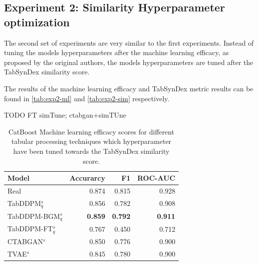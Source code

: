 \subsection{Experiment 2: Similarity Hyperparameter optimization}
\label{ch:Experiment-2}

The second set of experiments are very similar to the first experiments.
Instead of tuning the models hyperparameters after the machine learning efficacy, as proposed by the original authors,
the models hyperparameters are tuned after the TabSynDex similarity score.

The results of the machine learning efficacy and TabSynDex metric results can be found in \autoref{tab:exp2-ml} and \autoref{tab:exp2-sim} respectively.

TODO FT simTune; ctabgan+simTUne

\begin{table}[h]
	\centering
	\begin{tabular}{lrrr}
		\toprule
		\textbf{Model}        & \textbf{Accurarcy} & \textbf{F1}    & \textbf{ROC-AUC} \\
		\midrule
		Real                  & 0.874              & 0.815          & 0.928            \\
		TabDDPM$^{s}_{q}$     & 0.856              & 0.782          & 0.908            \\
		TabDDPM-BGM$^{s}_{q}$ & \textbf{0.859}     & \textbf{0.792} & \textbf{0.911}   \\
		TabDDPM-FT$^{s}_{q}$  & 0.767              & 0.450          & 0.712            \\
		CTABGAN$^{s}$         & 0.850              & 0.776          & 0.900            \\
		TVAE$^{s}$            & 0.845              & 0.780          & 0.900            \\
		\bottomrule
	\end{tabular}
	\caption[Experiment2-ML-Efficacy]{CatBoost Machine learning efficacy scores for different tabular processing techniques which hyperparameter have been tuned towards the TabSynDex similarity score.}
	\label{tab:exp2-ml}
\end{table}

